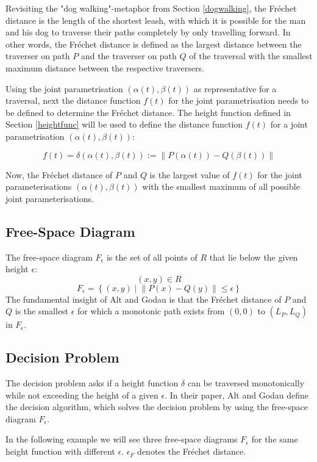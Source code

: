 Revisiting the "dog walking"-metaphor from Section \ref{dogwalking}, the Fréchet distance is the length of the shortest leash, with which it is possible for the man and his dog to traverse their paths completely by only travelling forward. In other words, the Fréchet distance is defined as the largest distance between the traverser on path $P$ and the traverser on path $Q$ of the traversal with the smallest maximum distance between the respective traversers.

Using the joint parametrisation $(\alpha(t), \beta(t))$ as representative for a traversal, next the distance function $f(t)$ for the joint parametrisation needs to be defined to determine the Fréchet distance. The height function defined in Section \ref{heightfunc} will be used to define the distance function $f(t)$ for a joint parametrisation $(\alpha(t), \beta(t))$:

$$f(t) = \delta(\alpha(t), \beta(t)) := \left\| P(\alpha(t)) - Q(\beta(t)) \right\|$$

Now, the Fréchet distance of $P$ and $Q$ is the largest value of $f(t)$ for the joint parameterisations $(\alpha(t), \beta(t))$ with the smallest maximum of all possible joint parameterisations.

\subsection{Free-Space Diagram}
The free-space diagram  $F_\epsilon$ is the set of all points of $R$ that lie below the given height $\epsilon$:
$$(x, y) \in R$$
$$F_\epsilon = \left\{ (x, y) \mid \left\| P(x) - Q(y) \right\| \leq \epsilon \right\}$$
The fundamental insight of Alt and Godau\cite{altgodau} is that the Fréchet distance of $P$ and $Q$ is the smallest $\epsilon$ for which a monotonic path exists from $(0,0)$ to $(L_P, L_Q)$ in $F_\epsilon$.\cite{rotelex}

\subsection{Decision Problem}

The decision problem asks if a height function $\delta$ can be traversed monotonically while not exceeding the height of a given $\epsilon$. In their paper, Alt and Godau\cite{altgodau} define the decision algorithm, which solves the decision problem by using the free-space diagram $F_{\epsilon}$.

In the following example we will see three free-space diagrams $F_\epsilon$ for the same height function with different $\epsilon$. $\epsilon_F$ denotes the Fréchet distance.

